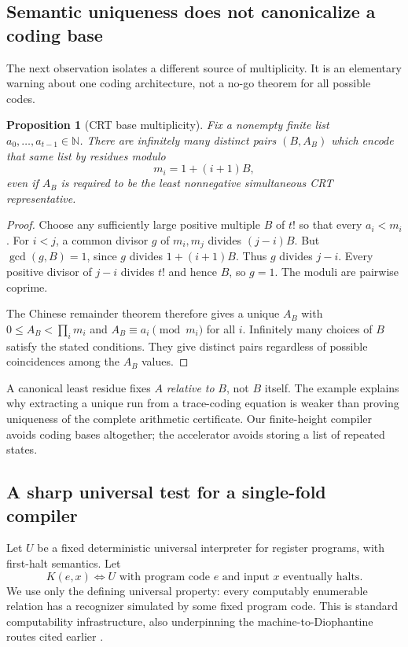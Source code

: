 \documentclass[11pt,a4paper]{article}
\newtheorem{proposition}[proposition]{Proposition}
\theoremstyle{definition}
\theoremstyle{remark}
\newcommand{\N}{\mathbb N}
\begin{document}
\subsection{Semantic uniqueness does not canonicalize a coding base}
The next observation isolates a different source of multiplicity. It is an elementary warning about one coding architecture, not a no-go theorem for all possible codes.
\begin{proposition}[CRT base multiplicity]\label{cdc:ct:prop:crt}
Fix a nonempty finite list $a_0,\ldots,a_{t-1}\in\N$. There are infinitely many distinct pairs $(B,A_B)$ which encode that same list by residues modulo
\[
 m_i=1+(i+1)B,
\]
even if $A_B$ is required to be the least nonnegative simultaneous CRT representative.
\end{proposition}
\begin{proof}
Choose any sufficiently large positive multiple $B$ of $t!$ so that every $a_i<m_i$. For $i<j$, a common divisor $g$ of $m_i,m_j$ divides $(j-i)B$. But $\gcd(g,B)=1$, since $g$ divides $1+(i+1)B$. Thus $g$ divides $j-i$. Every positive divisor of $j-i$ divides $t!$ and hence $B$, so $g=1$. The moduli are pairwise coprime.

The Chinese remainder theorem therefore gives a unique $A_B$ with
$0\le A_B<\prod_i m_i$ and $A_B\equiv a_i\pmod{m_i}$ for all $i$. Infinitely many choices of $B$ satisfy the stated conditions. They give distinct pairs regardless of possible coincidences among the $A_B$ values.
\end{proof}
A canonical least residue fixes $A$ \emph{relative to} $B$, not $B$ itself. The example explains why extracting a unique run from a trace-coding equation is weaker than proving uniqueness of the complete arithmetic certificate. Our finite-height compiler avoids coding bases altogether; the accelerator avoids storing a list of repeated states.

\subsection{A sharp universal test for a single-fold compiler}
Let $U$ be a fixed deterministic universal interpreter for register programs, with first-halt semantics. Let
\[
 K(e,x)\iff U\text{ with program code }e\text{ and input }x\text{ eventually halts}.
\]
We use only the defining universal property: every computably enumerable relation has a recognizer simulated by some fixed program code. This is standard computability infrastructure, also underpinning the machine-to-Diophantine routes cited earlier \cite{lf2022,jm1984}.
\end{document}
